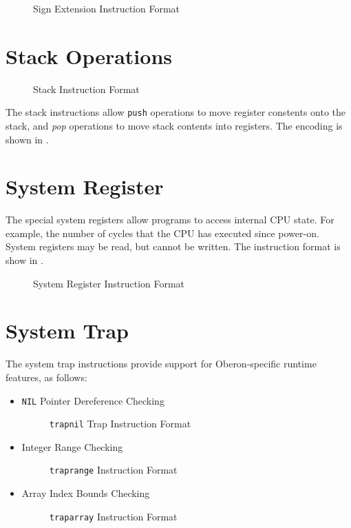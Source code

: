 \begin{figure}[H]
  \centering
    \usebox{\exttypebox}
    \caption{Sign Extension Instruction Format}
    \label{fig:sign-extend-format}
\end{figure}

\section{Stack Operations}

\begin{figure}[h!]
  \centering
    \usebox{\stktypebox}
    \caption{Stack Instruction Format}
    \label{fig:stack-format}
\end{figure}

The stack instructions allow \texttt{push} operations to move register
constents onto the stack, and \emph{pop} operations to move stack
contents into registers.  The encoding is shown in
.


\section{System Register}

The special system registers allow programs to access internal
\ac{CPU} state.  For example, the number of cycles that the \ac{CPU}
has executed since power-on.  System registers may be read, but cannot
be written.  The instruction format is show in .


\begin{figure}[H]
  \centering
  \usebox{\sregtypebox}
    \caption{System Register Instruction Format}
    \label{fig:sysreg-format}
\end{figure}

\section{System Trap}

The system trap instructions provide support for Oberon-specific
runtime features, as follows:

\begin{itemize}
\item \texttt{NIL} Pointer Dereference Checking

  \begin{figure}[H]
    \centering
    \usebox{\traptypebox}
    \caption{\texttt{trapnil} Trap Instruction Format}
  \end{figure}

\item Integer Range Checking
  \begin{figure}[H]
    \centering
    \usebox{\traptypebox}
    \caption{\texttt{traprange} Instruction Format}
  \end{figure}


\item Array Index Bounds Checking
  \begin{figure}[H]
    \centering
    \usebox{\traptypebox}
    \caption{\texttt{traparray} Instruction Format}
  \end{figure}
\end{itemize}
